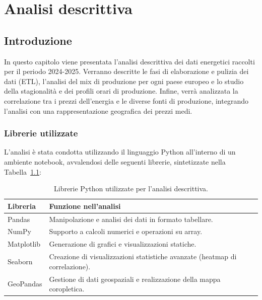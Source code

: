 \chapter{Analisi descrittiva} \label{cap:analisi_descrittiva}

\section{Introduzione}

In questo capitolo viene presentata l'analisi descrittiva dei dati energetici raccolti per il periodo 2024-2025. Verranno descritte le fasi di elaborazione e pulizia dei dati (ETL), l'analisi del mix di produzione per ogni paese europeo e lo studio della stagionalità e dei profili orari di produzione. Infine, verrà analizzata la correlazione tra i prezzi dell'energia e le diverse fonti di produzione, integrando l'analisi con una rappresentazione geografica dei prezzi medi.

\subsection{Librerie utilizzate}

L'analisi è stata condotta utilizzando il linguaggio Python all'interno di un ambiente notebook, avvalendosi delle seguenti librerie, sintetizzate nella Tabella~\ref{tab:librerie}:

\begin{table}[htbp]
    \centering
    \begin{tabular}{|l|p{10cm}|}
        \hline
        \rowcolor[gray]{0.9} \textbf{Libreria} & \textbf{Funzione nell'analisi} \\ \hline
        Pandas & Manipolazione e analisi dei dati in formato tabellare. \\
        NumPy & Supporto a calcoli numerici e operazioni su array. \\
        Matplotlib & Generazione di grafici e visualizzazioni statiche. \\
        Seaborn & Creazione di visualizzazioni statistiche avanzate (heatmap di correlazione). \\
        GeoPandas & Gestione di dati geospaziali e realizzazione della mappa coropletica. \\
        \hline
    \end{tabular}
    \caption{Librerie Python utilizzate per l'analisi descrittiva.}
    \label{tab:librerie}
\end{table}

